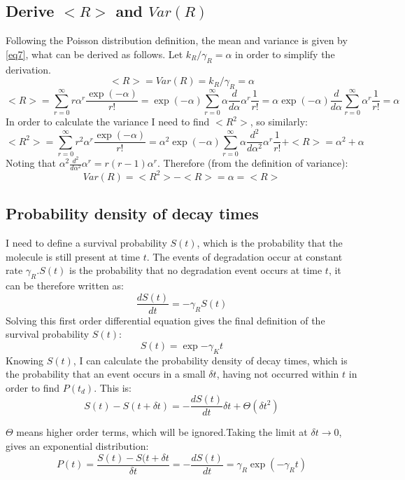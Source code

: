\documentclass[a4paper]{article}
\begin{document}
\subsection{Derive $<R>$ and $Var(R)$}
Following the Poisson distribution definition, the mean and variance is given by \ref{eq7}, what can be derived as follows. Let \(k_R/\gamma_R = \alpha\) in order to simplify the derivation. 
\begin{equation}
\label{eq7}
<R> = Var(R) = k_R/\gamma_R = \alpha 
\end{equation}
\[<R> = \sum_{r=0}^{\infty} r{\alpha}^r \frac{\exp{(-\alpha)}}{r!} = \exp{(-\alpha)} \sum_{r=0}^{\infty} \alpha\frac{d}{d\alpha} {\alpha}^r \frac{1}{r!} = \alpha \exp{(-\alpha)}\frac{d}{d\alpha}\sum_{r=0}^{\infty} {\alpha}^r\frac{1}{r!} = \alpha  \]
In order to calculate the variance I need to find $<R^2>$, so similarly:
\[<R^2> = \sum_{r=0}^{\infty} r^2{\alpha}^r \frac{\exp{(-\alpha)}}{r!} = \alpha^2\exp{(-\alpha)} \sum_{r=0}^{\infty} \alpha\frac{d^2}{d\alpha^2} {\alpha}^r \frac{1}{r!} + <R> = \alpha^2 + \alpha\]
Noting that \(\alpha^2\frac{d^2}{d\alpha^2}\alpha^r = r(r-1)\alpha^r\). Therefore (from the definition of variance): 
\[Var(R) = <R^2> - <R> = \alpha = <R>\]

\subsection{Probability density of decay times}
I need to define a survival probability $S(t)$, which is the probability that the molecule is still present at time $t$. The events of degradation occur at constant rate $\gamma_R$.$S(t)$ is the probability that no degradation event occurs at time $t$, it can be therefore written as:
\[\frac{dS(t)}{dt} = -\gamma_RS(t)\]
Solving this first order differential equation gives the final definition of the survival probability $S(t)$:
\begin{equation}
\label{survival}
S(t) = \exp{-\gamma_Kt}
\end{equation}
Knowing $S(t)$, I can calculate the probability density of decay times, which is the probability that an event occurs in a small $\delta t$, having not occurred within $t$ in order to find $P(t_d)$. This is: 
\[S(t) - S(t+\delta t) = - \frac{dS(t)}{dt}\delta t + \Theta(\delta t^2)\]

$\Theta$ means higher order terms, which will be ignored.Taking the limit at $\delta t \longrightarrow 0$, gives an exponential distribution: 
\[P(t) = \frac{S(t) - S(t+\delta t}{\delta t} = - \frac{dS(t)}{dt} = \gamma_R\exp(-\gamma_Rt)\]
\end{document}
